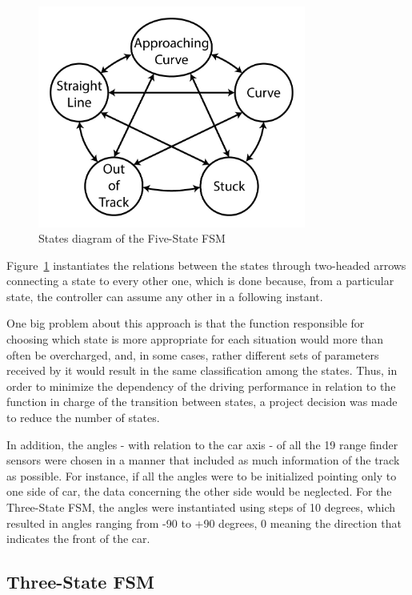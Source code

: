 	\begin{figure}[h]
		
		\centering
		\includegraphics[width=250pt]{FiveStateFSM}
		\caption{States diagram of the Five-State FSM}
		\label{Fig:FSM5Diagram}
		
	\end{figure}
	
	Figure~\ref{Fig:FSM5Diagram} instantiates the relations between the states through two-headed arrows connecting a state to every other one, which is done because, from a particular state, the controller can assume any other in a following instant.
	
	One big problem about this approach is that the function responsible for choosing which state is more appropriate for each situation would more than often be overcharged, and, in some cases, rather different sets of parameters received by it would result in the same classification among the states. Thus, in order to minimize the dependency of the driving performance in relation to the function in charge of the transition between states, a project decision was made to reduce the number of states.
	
	In addition, the angles - with relation to the car axis - of all the 19 range finder sensors were chosen in a manner that included as much information of the track as possible. For instance, if all the angles were to be initialized pointing only to one side of car, the data concerning the other side would be neglected. For the Three-State FSM, the angles were instantiated using steps of 10 degrees, which resulted in angles ranging from -90 to +90 degrees, 0 meaning the direction that indicates the front of the car.
		
\subsection{Three-State FSM} \label{subsec:FSM3}
	
